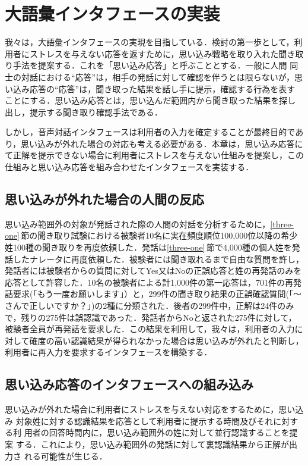 \section{大語彙インタフェースの実装}
\label{five}
我々は，大語彙インタフェースの実現を目指している．検討の第一歩として，利
用者にストレスを与えない応答を返すために，思い込み戦略を取り入れた聞き取
り手法を提案する．これを「思い込み応答」と呼ぶこととする．一般に人間
同士の対話における``応答''は，相手の発話に対して確認を伴うとは限らないが，思
い込み応答の``応答''は，聞き取った結果を話し手に提示，確認する行為を表す
ことにする．思い込み応答とは，思い込んだ範囲内から聞き取った結果を探し出し，提示する聞き取り確認手法である．

しかし，音声対話インタフェースは利用者の入力を確定することが最終目的であり，思い込みが外れた場合の対応も考える必要がある．本章は，思い込み応答にて正解を提示できない場合に利用者にストレスを与えない仕組みを提案し，この仕組みと思い込み応答を組み合わせたインタフェースを実装する．

\subsection{思い込みが外れた場合の人間の反応}
\label{five-one}
思い込み範囲外の対象が発話された際の人間の対話を分析するために，\ref{three-one}\,節の聞き取り試験における被験者10名に実在頻度順位100,000位以降の希少姓100種の聞き取りを再度依頼した．発話は\ref{three-one}\,節で4,000種の個人姓を発話したナレータに再度依頼した．被験者には聞き取れるまで自由な質問を許し，発話者には被験者からの質問に対してYes又はNoの正誤応答と姓の再発話のみを応答として許容した．10名の被験者による計1,000件の第一応答は，701件の再発話要求(「もう一度お願いします」）と，299件の聞き取り結果の正誤確認質問(「〜さんで正しいですか？」)の2種に分類された．後者の299件中，正解は24件のみで，残りの275件は誤認識であった．発話者からNoと返された275件に対して，被験者全員が再発話を要求した．この結果を利用して，我々は，利用者の入力に対して確度の高い認識結果が得られなかった場合は思い込みが外れたと判断し，利用者に再入力を要求するインタフェースを構築する．

\subsection{思い込み応答のインタフェースへの組み込み}
\label{five-three}
思い込みが外れた場合に利用者にストレスを与えない対応をするために，思い込み
対象姓に対する認識結果を応答として利用者に提示する時間及びそれに対する利
用者の回答時間内に，思い込み範囲外の姓に対して並行認識することを提案
する．これにより，思い込み範囲外の発話に対して裏認識結果から正解が出力さ
れる可能性が生じる．

